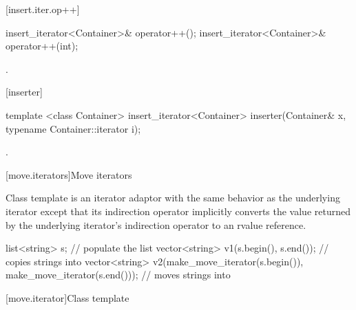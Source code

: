 [insert.iter.op++]{}

%
\begin{itemdecl}
insert_iterator<Container>& operator++();
insert_iterator<Container>& operator++(int);
\end{itemdecl}

\begin{itemdescr}
\pnum
\returns
{}.
\end{itemdescr}

[inserter]{}

%
\begin{itemdecl}
template <class Container>
  insert_iterator<Container> inserter(Container& x, typename Container::iterator i);
\end{itemdecl}

\begin{itemdescr}
\pnum
\returns
{}.
\end{itemdescr}

[move.iterators]{Move iterators}

\pnum
Class template  is an iterator adaptor
with the same behavior as the underlying iterator except that its
indirection operator implicitly converts the value returned by the
underlying iterator's indirection operator to an rvalue reference.
 

\pnum
\enterexample

\begin{codeblock}
list<string> s;
// populate the list 
vector<string> v1(s.begin(), s.end());          // copies strings into 
vector<string> v2(make_move_iterator(s.begin()),
                  make_move_iterator(s.end())); // moves strings into 
\end{codeblock}

\exitexample

[move.iterator]{Class template }

